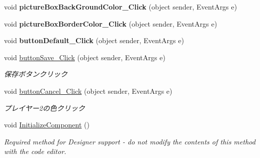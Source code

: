 \begin{DoxyCompactItemize}
void {\bfseries picture\+Box\+Back\+Ground\+Color\+\_\+\+Click} (object sender, Event\+Args e)
\item 
\mbox{\label{class_reversi4color_form_1_1_setting_form_a941547bb4074c9efe16a0732cdb7b5ca}} 
void {\bfseries picture\+Box\+Border\+Color\+\_\+\+Click} (object sender, Event\+Args e)
\item 
\mbox{\label{class_reversi4color_form_1_1_setting_form_a30733fae8a3ceb4aca37def31f29d594}} 
void {\bfseries button\+Default\+\_\+\+Click} (object sender, Event\+Args e)
\item 
void \hyperlink{class_reversi4color_form_1_1_setting_form_ab9d726aa75246b7ad2dbc34c30aaa549}{button\+Save\+\_\+\+Click} (object sender, Event\+Args e)
\begin{DoxyCompactList}\small\item\em 保存ボタンクリック \end{DoxyCompactList}\item 
void \hyperlink{class_reversi4color_form_1_1_setting_form_a7e7098f2ad774fc34694fd778318a014}{button\+Cancel\+\_\+\+Click} (object sender, Event\+Args e)
\begin{DoxyCompactList}\small\item\em プレイヤー2の色クリック \end{DoxyCompactList}\item 
void \hyperlink{class_reversi4color_form_1_1_setting_form_a16ffb6338dd99bb75b8b52e8df9fe271}{Initialize\+Component} ()
\begin{DoxyCompactList}\small\item\em Required method for Designer support -\/ do not modify the contents of this method with the code editor. \end{DoxyCompactList}\end{DoxyCompactItemize}
